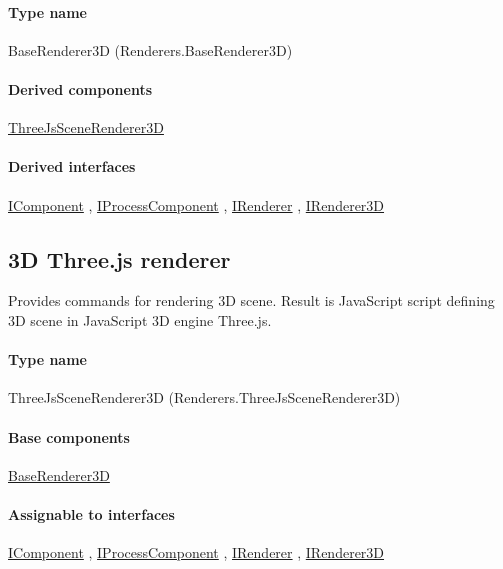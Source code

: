 \paragraph{Type name}
BaseRenderer3D (Renderers.BaseRenderer3D) 	\paragraph{Derived components}
		\hyperref[Malsys.Processing.Components.Renderers.ThreeJsSceneRenderer3D]{ThreeJsSceneRenderer3D}%
	\paragraph{Derived interfaces}
		\hyperref[Malsys.Processing.Components.IComponent]{IComponent}%
, 		\hyperref[Malsys.Processing.Components.IProcessComponent]{IProcessComponent}%
, 		\hyperref[Malsys.Processing.Components.IRenderer]{IRenderer}%
, 		\hyperref[Malsys.Processing.Components.Renderers.IRenderer3D]{IRenderer3D}%
	


\subsection{3D Three.js renderer}
\label{Malsys.Processing.Components.Renderers.ThreeJsSceneRenderer3D}
Provides commands for rendering 3D scene.
            Result is JavaScript script defining 3D scene in JavaScript 3D engine Three.js.\paragraph{Type name}
ThreeJsSceneRenderer3D (Renderers.ThreeJsSceneRenderer3D) 	\paragraph{Base components}
		\hyperref[Malsys.Processing.Components.Renderers.BaseRenderer3D]{BaseRenderer3D}%
	\paragraph{Assignable to interfaces}
		\hyperref[Malsys.Processing.Components.IComponent]{IComponent}%
, 		\hyperref[Malsys.Processing.Components.IProcessComponent]{IProcessComponent}%
, 		\hyperref[Malsys.Processing.Components.IRenderer]{IRenderer}%
, 		\hyperref[Malsys.Processing.Components.Renderers.IRenderer3D]{IRenderer3D}%
